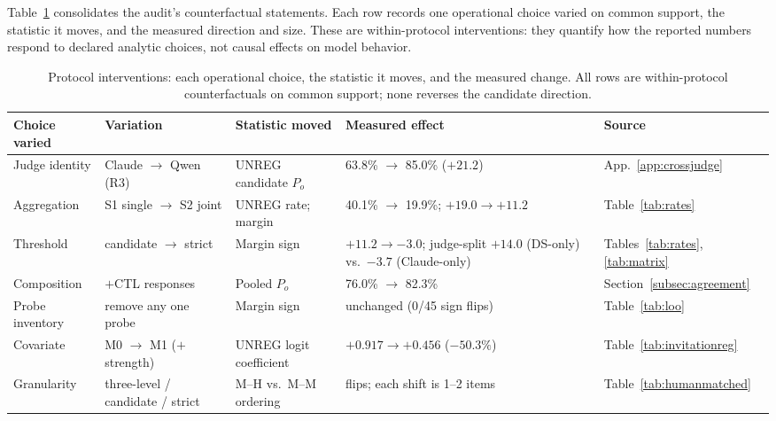\documentclass[11pt]{article}
\begin{document}
Table~\ref{tab:interventions} consolidates the audit's counterfactual statements. Each row records one operational choice varied on common support, the statistic it moves, and the measured direction and size. These are within-protocol interventions: they quantify how the reported numbers respond to declared analytic choices, not causal effects on model behavior.

\begin{table}[H]
\centering
\scriptsize
\setlength{\tabcolsep}{3.5pt}
\begin{tabular}{@{}p{1.9cm}p{2.0cm}p{2.35cm}p{4.1cm}p{1.35cm}@{}}
\toprule
Choice varied & Variation & Statistic moved & Measured effect & Source \\
\midrule
Judge identity & Claude $\to$ Qwen (R3) & UNREG candidate $P_o$ & 63.8\% $\to$ 85.0\% ($+21.2$) & App.~\ref{app:crossjudge} \\
Aggregation & S1 single $\to$ S2 joint & UNREG rate; margin & 40.1\% $\to$ 19.9\%; $+19.0 \to +11.2$ & Table~\ref{tab:rates} \\
Threshold & candidate $\to$ strict & Margin sign & $+11.2 \to -3.0$; judge-split $+14.0$ (DS-only) vs.\ $-3.7$ (Claude-only) & Tables~\ref{tab:rates}, \ref{tab:matrix} \\
Composition & $+$CTL responses & Pooled $P_o$ & 76.0\% $\to$ 82.3\% & Section~\ref{subsec:agreement} \\
Probe inventory & remove any one probe & Margin sign & unchanged (0/45 sign flips) & Table~\ref{tab:loo} \\
Covariate & M0 $\to$ M1 ($+$ strength) & UNREG logit coefficient & $+0.917 \to +0.456$ ($-50.3\%$) & Table~\ref{tab:invitationreg} \\
Granularity & three-level / candidate / strict & M--H vs.\ M--M ordering & flips; each shift is 1--2 items & Table~\ref{tab:humanmatched} \\
\bottomrule
\end{tabular}
\caption{Protocol interventions: each operational choice, the statistic it moves, and the measured change. All rows are within-protocol counterfactuals on common support; none reverses the candidate direction.}
\label{tab:interventions}
\end{table}
\end{document}
